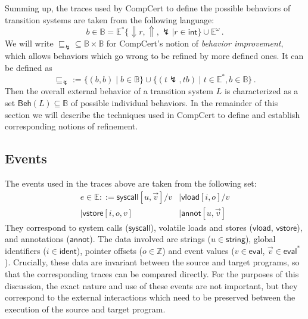\documentclass[sigplan,10pt,review,anonymous]{acmart}
\newcommand{\kw}[1]{\ensuremath{ \mathsf{#1} }}
\newcommand{\refby}{\sqsubseteq}
\begin{document}
Summing up,
the traces used by CompCert to define
the possible behaviors of transition systems
are taken from the following language:
\[
  b \in \mathbb{B} =
    \mathbb{E}^*
      \{ {\Downarrow} r, {\Uparrow}, {\lightning} \mid r \in \kw{int} \}
      \cup
    \mathbb{E}^\omega
  \,.
\]
We will write
${\refby_\lightning} \subseteq \mathbb{B} \times \mathbb{B}$
for CompCert's notion of \emph{behavior improvement},
which allows behaviors which go wrong to
be refined by more defined ones.
It can be defined as
\[
  {\refby_\lightning} := \{ (b, b) \mid b \in \mathbb{B} \}
    \cup \{ (t \lightning, t b) \mid
            t \in \mathbb{E}^*, b \in \mathbb{B} \}
  \,.
\]
Then the overall external behavior
of a transition system $L$
is characterized
as a set $\kw{Beh}(L) \subseteq \mathbb{B}$
of possible individual behaviors.
In the remainder of this section we will describe
the techniques used in CompCert to define and establish
corresponding notions of refinement.



\subsection{Events} %

The events used in the traces above are taken from the following set:
\begin{align*}
  e \in \mathbb{E} ::=
    \kw{syscall}[u, \vec{v}]/v & \mid
    \kw{vload}[i, o]/v \\ \mid
    \kw{vstore}[i, o, v] & \mid
    \kw{annot}[u, \vec{v}]
\end{align*}
They correspond to system calls ($\kw{syscall}$),
volatile loads and stores ($\kw{vload}$, $\kw{vstore}$),
and annotations ($\kw{annot}$).
The data involved
are strings ($u \in \kw{string}$),
global identifiers ($i \in \kw{ident}$),
pointer offsets ($o \in \mathbb{Z}$) and
event values ($v \in \kw{eval}$, $\vec{v} \in \kw{eval}^*$).
Crucially,
these data are invariant between the source and target programs,
so that the corresponding traces can be compared directly.
For the purposes of this discussion,
the exact nature and use of these events
are not important,
but they correspond to the external interactions
which need to be preserved between the execution
of the source and target program.
\end{document}
